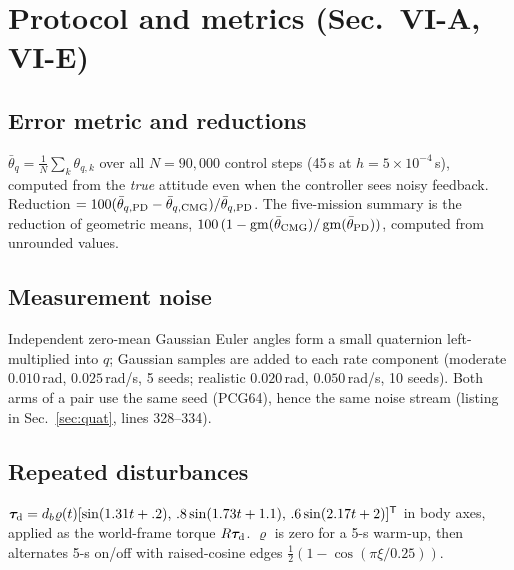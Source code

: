 \documentclass[11pt]{article}
\newcommand{\srcroot}{../..}
\newcommand{\T}{^{\mathsf T}}
\newcommand{\code}[1]{\path{#1}}
\theoremstyle{remark}
\newcommand{\listing}[4]{%
  \Needspace{8\baselineskip}%
  }
\begin{document}
\section{Protocol and metrics (Sec.~VI-A, VI-E)}
\subsection{Error metric and reductions}
$\bar\theta_q=\frac1N\sum_k\theta_{q,k}$ over all $N=90{,}000$ control steps (45\,s at $h=5\times10^{-4}$\,s), computed from the
\emph{true} attitude even when the controller sees noisy feedback. Reduction $=100(\bar\theta_{q,\rm PD}-\bar\theta_{q,\rm CMG})/\bar\theta_{q,\rm PD}$.
The five-mission summary is the reduction of geometric means, $100\,(1-\operatorname{gm}(\bar\theta_{\rm CMG})/\operatorname{gm}(\bar\theta_{\rm PD}))$,
computed from unrounded values.
\listing{experiments/final_robustness_gating_2026-09-20/run_final_robustness.py}{440}{441}{per-step true and fed-back error}
\listing{experiments/final_robustness_gating_2026-09-20/run_final_robustness.py}{725}{731}{summary metrics}

\subsection{Measurement noise}
Independent zero-mean Gaussian Euler angles form a small quaternion left-multiplied into $q$; Gaussian samples are added to each
rate component (moderate $0.010$\,rad, $0.025$\,rad/s, 5 seeds; realistic $0.020$\,rad, $0.050$\,rad/s, 10 seeds). Both arms of a
pair use the same seed (PCG64), hence the same noise stream (listing in Sec.~\ref{sec:quat}, lines 328--334).

\subsection{Repeated disturbances}
$\bm\tau_{\rm d}=d_b\varrho(t)[\sin(1.31t+.2),\,.8\sin(1.73t+1.1),\,.6\sin(2.17t+2)]\T$ in body axes, applied as the world-frame torque
$R\bm\tau_{\rm d}$. $\varrho$ is zero for a 5-s warm-up, then alternates 5-s on/off with raised-cosine edges
$\frac12(1-\cos(\pi\xi/0.25))$.
\listing{experiments/final_robustness_gating_2026-09-20/run_final_robustness.py}{110}{129}{envelope $\varrho(t)$}
\listing{experiments/final_robustness_gating_2026-09-20/run_final_robustness.py}{424}{438}{body-frame multi-sine, applied through \code{xfrc_applied}}
\end{document}
